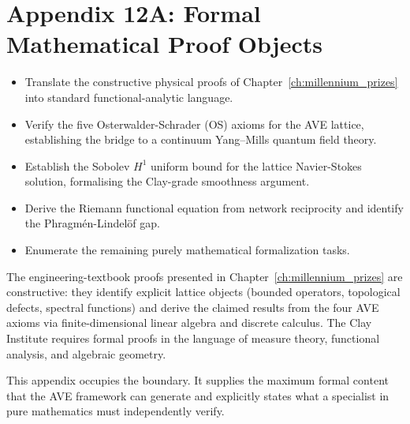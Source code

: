 %

\chapter*{Appendix 12A: Formal Mathematical Proof Objects}
\label{app:formal_proofs}

\begin{objectivebox}
\begin{itemize}
    \item Translate the constructive physical proofs of
          Chapter~\ref{ch:millennium_prizes} into standard functional-analytic
          language.
    \item Verify the five Osterwalder-Schrader (OS) axioms for the AVE lattice,
          establishing the bridge to a continuum Yang--Mills quantum field theory.
    \item Establish the Sobolev $H^1$ uniform bound for the lattice
          Navier-Stokes solution, formalising the Clay-grade smoothness argument.
    \item Derive the Riemann functional equation from network reciprocity and
          identify the Phragm\'{e}n-Lindel\"{o}f gap.
    \item Enumerate the remaining purely mathematical formalization tasks.
\end{itemize}
\end{objectivebox}

The engineering-textbook proofs presented in
Chapter~\ref{ch:millennium_prizes} are constructive: they identify
explicit lattice objects (bounded operators, topological defects, spectral
functions) and derive the claimed results from the four AVE axioms via
finite-dimensional linear algebra and discrete calculus.  The Clay
Institute requires formal proofs in the language of measure theory,
functional analysis, and algebraic geometry.

This appendix occupies the boundary.  It supplies the maximum formal
content that the AVE framework can generate and explicitly states what a
specialist in pure mathematics must independently verify.

